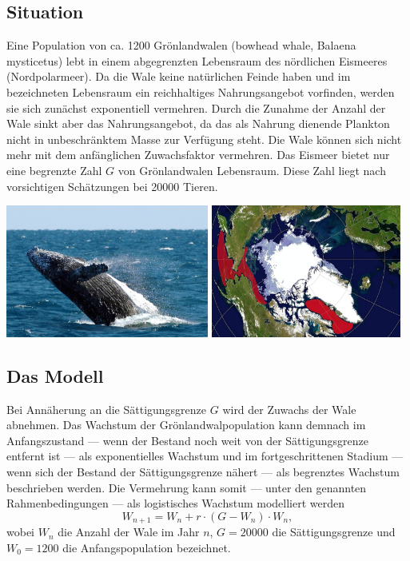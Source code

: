 \documentclass[%
11pt,%
twoside,%
titlepage,%
german,%
headsepline%
]{scrartcl}
\begin{document}
\subsection{Situation}
Eine
Population von ca. 1200 Grönlandwalen (bowhead whale, Balaena mysticetus) lebt in einem abgegrenzten Lebensraum des nördlichen Eismeeres (Nordpolarmeer). Da die Wale keine natürlichen Feinde haben und im bezeichneten Lebensraum ein reichhaltiges Nahrungsangebot vorfinden, werden sie sich zunächst exponentiell vermehren. Durch die Zunahme der Anzahl der Wale sinkt aber das Nahrungsangebot, da das als Nahrung dienende Plankton nicht in unbeschränktem Masse zur Verfügung steht. Die Wale können sich nicht mehr mit dem anfänglichen Zuwachsfaktor vermehren. Das Eismeer bietet nur eine begrenzte Zahl $G$ von Grönlandwalen Lebensraum. Diese Zahl liegt nach vorsichtigen Schätzungen bei 20000 Tieren.\\[2ex]

\begin{center}
\includegraphics[width=0.5\textwidth]{pictures/groenlandwale.jpeg}
\includegraphics[width=0.4685\textwidth]{pictures/groenlandwalegebiet.jpg}
\end{center}


\subsection{Das Modell}
Bei Annäherung an die Sättigungsgrenze $G$ wird der Zuwachs der Wale abnehmen. Das Wachstum der Grönlandwalpopulation kann demnach im Anfangszustand --- wenn der Bestand noch weit von der Sättigungsgrenze entfernt ist --- als exponentielles Wachstum und im fortgeschrittenen Stadium --- wenn sich der Bestand der Sättigungsgrenze nähert --- als begrenztes Wachstum beschrieben werden. Die Vermehrung kann somit --- unter den genannten Rahmenbedingungen --- als logistisches Wachstum modelliert werden
$$W_{n+1}=W_n+r\cdot (G-W_n)\cdot W_n,$$
wobei $W_n$ die Anzahl der Wale im Jahr $n$, $G=20000$ die Sättigungsgrenze und $W_0=1200$ die Anfangspopulation bezeichnet.
\end{document}

